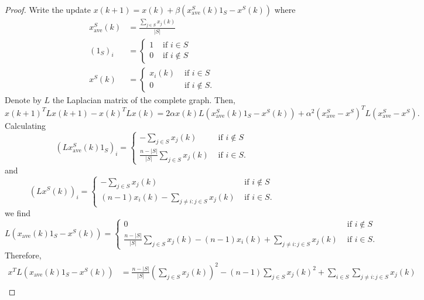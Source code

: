 \documentclass{amsart}
\theoremstyle{remark}
\begin{document}
\begin{proof}
	Write the update $x(k+1) = x(k) + \beta(x_\text{ave}^S(k)1_S - x^S(k))$ where
	\begin{align*}
		x_\text{ave}^S(k) &= \frac{\sum_{j\in S}x_j(k)}{|S|}\\
		(1_S)_i &= \begin{cases}
			1 & \text{ if } i\in S\\
			0 & \text{ if } i\not\in S
		\end{cases}\\
		x^S(k) &= \begin{cases}
			x_i(k) & \text{ if } i\in S\\
			0 & \text{ if } i\not\in S.
		\end{cases}
	\end{align*}
	Denote by $L$ the Laplacian matrix of the complete graph. Then,
	\begin{equation}
		x(k+1)^TLx(k+1) - x(k)^TLx(k) = 2\alpha x(k)L(x^S_\text{ave}(k)1_S - x^S(k)) + \alpha^2(x_{\text{ave}}^S-x^S)^TL(x_{\text{ave}}^S-x^S).
	\end{equation}
	Calculating
	\begin{equation}
		(Lx_{\text{ave}}^S(k)1_S)_i = \begin{cases}
			-\sum_{j\in S}x_j(k) & \text{ if } i \not\in S\\
			\frac{n-|S|}{|S|}\sum_{j\in S}x_j(k) & \text{ if } i \in S.
		\end{cases}
	\end{equation}
	and
	\begin{equation}
		(Lx^S(k))_i = \begin{cases}
			-\sum_{j\in S}x_j(k) & \text{ if } i\not\in S\\
			(n-1)x_i(k) - \sum_{j\neq i : j\in S}x_j(k) & \text{ if } i\in S.
		\end{cases}
	\end{equation}
	we find 
	\begin{equation}
		L(x_{\text{ave}}(k)1_S - x^S(k)) = \begin{cases}
			0 & \text{ if } i \not\in S\\
			\frac{n-|S|}{|S|}\sum_{j\in S}x_j(k) - (n-1)x_i(k) + \sum_{j\neq i: j\in S}x_j(k) & \text{ if } i \in S.
		\end{cases}
	\end{equation}
	Therefore,
	\begin{align}
		x^TL(x_{\text{ave}}(k)1_S - x^S(k)) &= \frac{n-|S|}{|S|}\left(\sum_{j\in S}x_j(k)\right)^2 - (n-1)\sum_{j\in S}x_j(k)^2 + \sum_{i\in S}\sum_{j\neq i: j\in S}x_j(k)\\

\end{align}
\end{proof}
\end{document}
